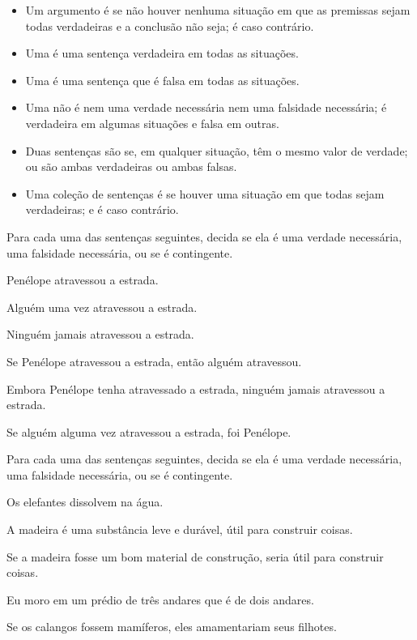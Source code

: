 \begin{itemize}
	\item Um argumento é  se não houver nenhuma situação em que as premissas sejam todas verdadeiras e a conclusão não seja; é  caso contrário.

\item Uma  é uma sentença verdadeira em todas as situações.

\item Uma  é uma sentença que é falsa em todas as situações.

\item Uma  não é nem uma verdade necessária nem uma falsidade necessária; é verdadeira em algumas situações e falsa em outras.

\item Duas sentenças são  se, em qualquer situação, têm o mesmo valor de verdade; ou são ambas verdadeiras ou ambas falsas.

\item Uma coleção de sentenças é  se houver uma situação em que todas sejam verdadeiras; e é  caso contrário.
\end{itemize}


\practiceproblems
\problempart
\label{pr.EnglishTautology2}
Para cada uma das sentenças seguintes, decida se ela é uma verdade necessária, uma falsidade necessária, ou se é contingente.
\begin{earg}
\item Penélope atravessou a estrada.
\item Alguém uma vez atravessou a estrada.
\item Ninguém jamais atravessou a estrada.
\item Se Penélope atravessou a estrada, então alguém atravessou.
\item Embora Penélope tenha atravessado a estrada, ninguém jamais atravessou a estrada.
\item Se alguém alguma vez atravessou a estrada, foi Penélope.
\end{earg}

\problempart
Para cada uma das sentenças seguintes, decida se ela é uma verdade necessária, uma falsidade necessária, ou se é contingente.
\begin{earg}
\item Os elefantes dissolvem na água.
\item A madeira é uma substância leve e durável, útil para construir coisas.
\item Se a madeira fosse um bom material de construção, seria útil para construir coisas.
\item Eu moro em um prédio de três andares que é de dois andares.
\item Se os calangos fossem mamíferos, eles amamentariam seus filhotes.
\end{earg}


